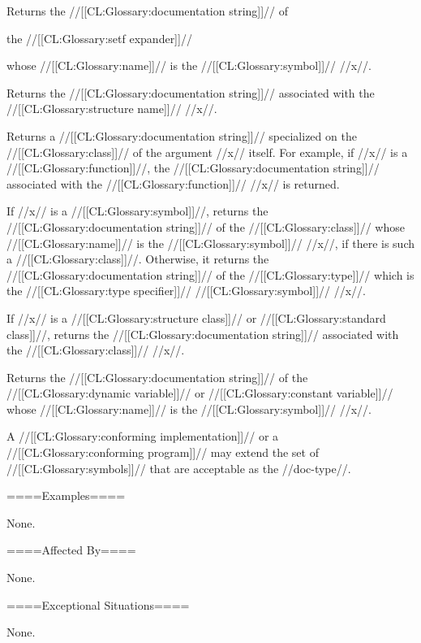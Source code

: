 Returns the //[[CL:Glossary:documentation string]]// of

the //[[CL:Glossary:setf expander]]//

whose //[[CL:Glossary:name]]// is the //[[CL:Glossary:symbol]]// //x//.


Returns the //[[CL:Glossary:documentation string]]// associated with the //[[CL:Glossary:structure name]]// //x//.


Returns a //[[CL:Glossary:documentation string]]// specialized on the //[[CL:Glossary:class]]// of the argument //x// itself. For example, if //x// is a //[[CL:Glossary:function]]//, the //[[CL:Glossary:documentation string]]// associated with the //[[CL:Glossary:function]]// //x// is returned.


If //x// is a //[[CL:Glossary:symbol]]//, returns the //[[CL:Glossary:documentation string]]// of the //[[CL:Glossary:class]]// whose //[[CL:Glossary:name]]// is the //[[CL:Glossary:symbol]]// //x//, if there is such a //[[CL:Glossary:class]]//. Otherwise, it returns the //[[CL:Glossary:documentation string]]// of the //[[CL:Glossary:type]]// which is the //[[CL:Glossary:type specifier]]// //[[CL:Glossary:symbol]]// //x//.

If //x// is a //[[CL:Glossary:structure class]]// or //[[CL:Glossary:standard class]]//, returns the //[[CL:Glossary:documentation string]]// associated with the //[[CL:Glossary:class]]// //x//.


Returns the //[[CL:Glossary:documentation string]]// of the //[[CL:Glossary:dynamic variable]]// or //[[CL:Glossary:constant variable]]// whose //[[CL:Glossary:name]]// is the //[[CL:Glossary:symbol]]// //x//.

\endlist

A //[[CL:Glossary:conforming implementation]]// or a //[[CL:Glossary:conforming program]]// may extend the set of //[[CL:Glossary:symbols]]// that are acceptable as the //doc-type//.

====Examples====

None.

====Affected By====

None.

====Exceptional Situations====

None.



